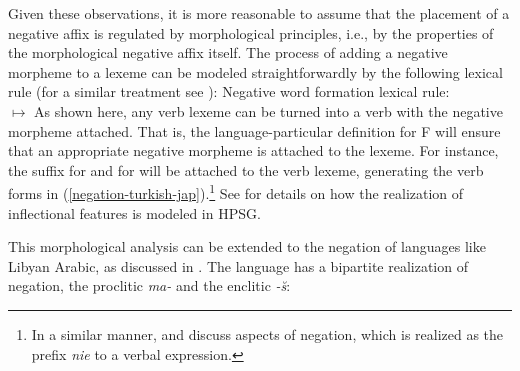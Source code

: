 \documentclass[output=paper,biblatex,babelshorthands,newtxmath,draftmode,colorlinks,citecolor=brown]{langscibook}
\begin{document}
\begin{exe}
\begin{xlist}
\begin{exe}
\begin{xlist}
Given these observations, it is more reasonable to assume that the placement of a
negative affix is regulated by morphological principles, i.e., by
the properties of the morphological negative affix itself.
The process of adding a negative morpheme to a lexeme can be modeled
straightforwardly by the following lexical rule (for a similar treatment see \cites[36]{Kim:00}[111--112]{Crowgey:12}):
\ea
\label{lr-neg-word-formation}
Negative word formation lexical rule:\\
 $\mapsto$
\avm{
[\type*{neg-v-lxm}
 phon < \normalfont !f$_{\mathit{neg}}$(\1)! >\\
 synsem|loc [ cat|head|pol \type{neg}\\
              cont [ \type*{neg-rel}
                     arg1 & \2 ]~~~~~]]
}
\z
%
%
As shown here, any verb lexeme can be turned into a verb with the negative
morpheme attached. That is, the language-particular definition for
F will ensure that an appropriate
negative morpheme is attached to the lexeme. For instance, the
suffix  for  and  for  will be attached to the verb
lexeme, generating the verb forms in (\ref{negation-turkish-jap}).\footnote{In a similar
manner, \citet{PK:99} and \citet{Prz:00, Prz:01}
discuss aspects of  negation, which is realized as the prefix
  \emph{nie} to a verbal expression.} See  for details on how the
realization of inflectional features is modeled in HPSG.

This morphological analysis can be extended to the negation of languages
like Libyan Arabic, as discussed in \citet{BK:12}. The language
has a bipartite realization of negation, the proclitic \emph{ma-} and the enclitic \emph{-\u{s}}:


\end{xlist}
\end{exe}
\end{xlist}
\end{exe}
\end{document}
